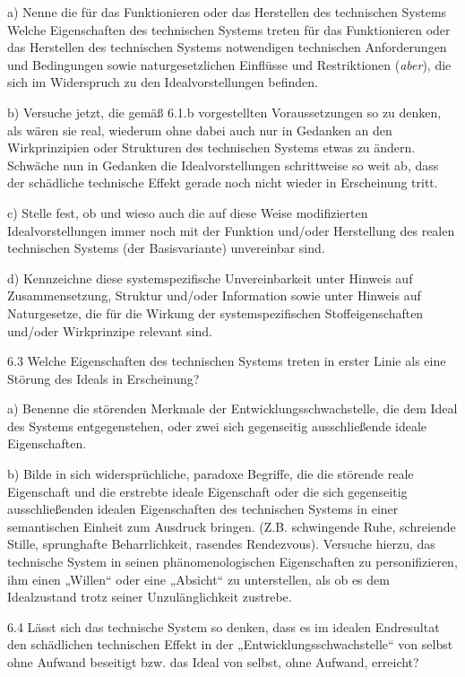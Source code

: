 \documentclass[12pt,a4paper]{article}
\begin{document}
a) Nenne die für das Funktionieren oder das Herstellen des technischen Systems
Welche Eigenschaften des technischen Systems treten für das Funktionieren oder
das Herstellen des technischen Systems notwendigen technischen Anforderungen
und Bedingungen sowie naturgesetzlichen Einflüsse und Restriktionen
(\emph{aber}), die sich im Widerspruch zu den Idealvorstellungen befinden.

b) Versuche jetzt, die gemäß 6.1.b vorgestellten Voraussetzungen so zu denken,
als wären sie real, wiederum ohne dabei auch nur in Gedanken an den
Wirkprinzipien oder Strukturen des technischen Systems etwas zu
ändern. Schwäche nun in Gedanken die Idealvorstellungen schrittweise so weit
ab, dass der schädliche technische Effekt gerade noch nicht wieder in
Erscheinung tritt.

c) Stelle fest, ob und wieso auch die auf diese Weise modifizierten
Idealvorstellungen immer noch mit der Funktion und/oder Herstellung des realen
technischen Systems (der Basisvariante) unvereinbar sind.

d) Kennzeichne diese systemspezifische Unvereinbarkeit unter Hinweis auf
Zusammensetzung, Struktur und/oder Information sowie unter Hinweis auf
Naturgesetze, die für die Wirkung der systemspezifischen Stoffeigenschaften
und/oder Wirkprinzipe relevant sind.

6.3 Welche Eigenschaften des technischen Systems treten in erster Linie als
eine Störung des Ideals in Erscheinung?

a) Benenne die störenden Merkmale der Entwicklungsschwachstelle, die dem Ideal
des Systems entgegenstehen, oder zwei sich gegenseitig ausschließende ideale
Eigenschaften.

b) Bilde in sich widersprüchliche, paradoxe Begriffe, die die störende reale
Eigenschaft und die erstrebte ideale Eigenschaft oder die sich gegenseitig
ausschließenden idealen Eigenschaften des technischen Systems in einer
semantischen Einheit zum Ausdruck bringen. (Z.B. schwingende Ruhe, schreiende
Stille, sprunghafte Beharrlichkeit, rasendes Rendezvous). Versuche hierzu, das
technische System in seinen phänomenologischen Eigenschaften zu
personifizieren, ihm einen „Willen“ oder eine „Absicht“ zu unterstellen, als ob
es dem Idealzustand trotz seiner Unzulänglichkeit zustrebe.

6.4 Lässt sich das technische System so denken, dass es im idealen Endresultat
den schädlichen technischen Effekt in der „Entwicklungsschwachstelle“ von
selbst ohne Aufwand beseitigt bzw. das Ideal von selbst, ohne Aufwand,
erreicht?
\end{document}
